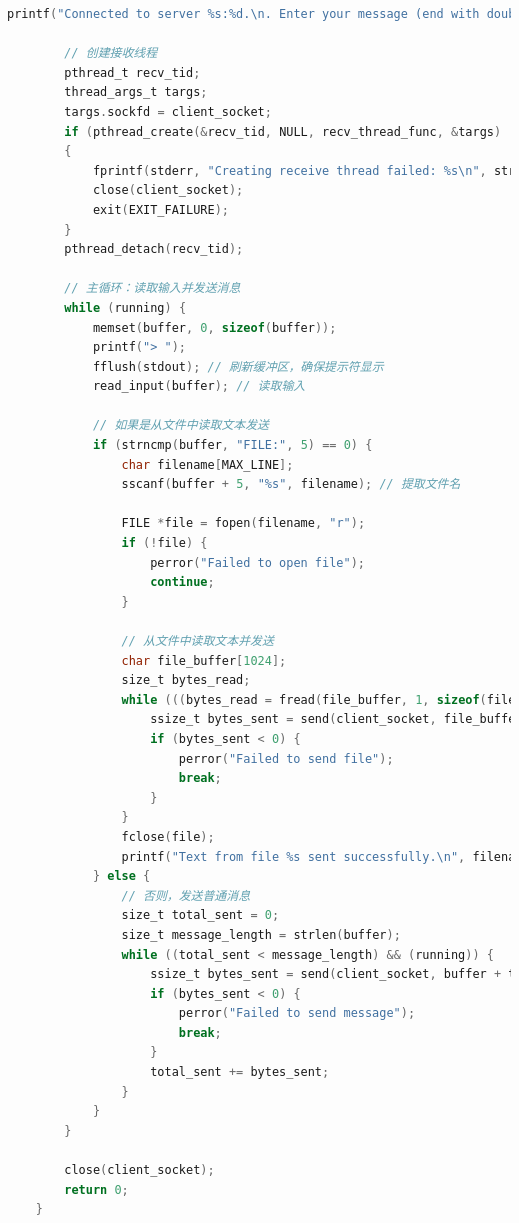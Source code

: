 \documentclass[14pt,a4paper,UTF8,twoside]{article}
\begin{document}
\begin{lstlisting}[language=C]
        printf("Connected to server %s:%d.\n. Enter your message (end with double ENTER):\n", server_ip, server_port);
    
        // 创建接收线程
        pthread_t recv_tid;
        thread_args_t targs;
        targs.sockfd = client_socket;
        if (pthread_create(&recv_tid, NULL, recv_thread_func, &targs) != 0)
        {
            fprintf(stderr, "Creating receive thread failed: %s\n", strerror(errno));
            close(client_socket);
            exit(EXIT_FAILURE);
        }
        pthread_detach(recv_tid);
    
        // 主循环：读取输入并发送消息
        while (running) {
            memset(buffer, 0, sizeof(buffer));
            printf("> ");
            fflush(stdout); // 刷新缓冲区，确保提示符显示
            read_input(buffer); // 读取输入
    
            // 如果是从文件中读取文本发送
            if (strncmp(buffer, "FILE:", 5) == 0) {
                char filename[MAX_LINE];
                sscanf(buffer + 5, "%s", filename); // 提取文件名
    
                FILE *file = fopen(filename, "r");
                if (!file) {
                    perror("Failed to open file");
                    continue;
                }
    
                // 从文件中读取文本并发送
                char file_buffer[1024];
                size_t bytes_read;
                while (((bytes_read = fread(file_buffer, 1, sizeof(file_buffer), file)) > 0) && (running)) {
                    ssize_t bytes_sent = send(client_socket, file_buffer, bytes_read, 0); // 逐块发送文件内容
                    if (bytes_sent < 0) {
                        perror("Failed to send file");
                        break;
                    }
                }
                fclose(file);
                printf("Text from file %s sent successfully.\n", filename);
            } else {
                // 否则，发送普通消息
                size_t total_sent = 0;
                size_t message_length = strlen(buffer);
                while ((total_sent < message_length) && (running)) {
                    ssize_t bytes_sent = send(client_socket, buffer + total_sent, message_length - total_sent, 0);
                    if (bytes_sent < 0) {
                        perror("Failed to send message");
                        break;
                    }
                    total_sent += bytes_sent;
                }
            }
        }
    
        close(client_socket);
        return 0;
    }    
\end{lstlisting}
\end{document}
